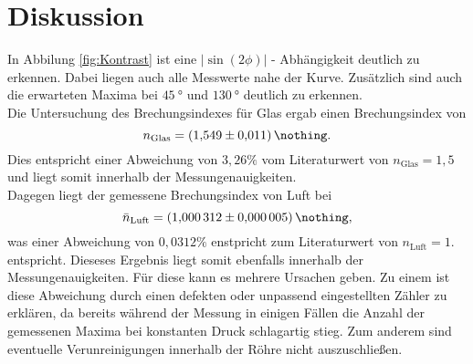 \FloatBarrier
\newpage
\section{Diskussion}
In Abbilung \ref{fig:Kontrast} ist eine $|\sin{(2\phi)}|$ - Abhängigkeit deutlich zu erkennen.
Dabei liegen auch alle Messwerte nahe der Kurve.
Zusätzlich sind auch die erwarteten Maxima bei $\SI{45}{\degree}$ und $\SI{130}{\degree}$ deutlich zu erkennen. \\
Die Untersuchung des Brechungsindexes für Glas ergab einen Brechungsindex von
\begin{equation}
    n_\text{Glas} = \SI{1.549 \pm 0.011}{\nothing} .
\end{equation}
Dies entspricht einer Abweichung von $3,26 \%$ vom Literaturwert von $n_\text{Glas} = 1,5$ und liegt somit innerhalb der Messungenauigkeiten.  \\
Dagegen liegt der gemessene Brechungsindex von Luft bei
\begin{equation}
    \bar{n}_\text{Luft} = \SI{1.000312 \pm 0.000005}{\nothing} ,
 \end{equation}
was einer Abweichung von $0,0312 \%$ enstpricht zum Literaturwert von $n_\text{Luft} = 1$. entspricht. Dieseses Ergebnis liegt somit ebenfalls innerhalb der Messungenauigkeiten. Für diese kann es mehrere Ursachen geben. Zu einem ist diese Abweichung durch einen defekten oder unpassend eingestellten Zähler zu erklären, da bereits während der Messung in einigen Fällen die Anzahl der gemessenen Maxima bei konstanten Druck schlagartig stieg. Zum anderem sind eventuelle Verunreinigungen innerhalb der Röhre nicht auszuschließen.
